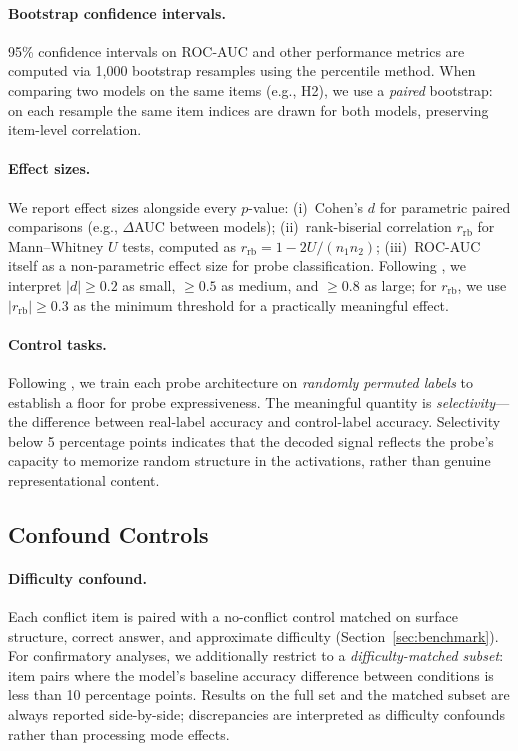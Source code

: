 \paragraph{Bootstrap confidence intervals.}
95\% confidence intervals on ROC-AUC and other performance metrics are
computed via 1{,}000 bootstrap resamples using the percentile method.  When
comparing two models on the same items (e.g., H2), we use a \emph{paired}
bootstrap: on each resample the same item indices are drawn for both models,
preserving item-level correlation.

\paragraph{Effect sizes.}
We report effect sizes alongside every $p$-value:
(i)~Cohen's $d$ for parametric paired comparisons (e.g., $\Delta$AUC
between models);
(ii)~rank-biserial correlation $r_{\text{rb}}$ for Mann--Whitney $U$ tests,
computed as $r_{\text{rb}} = 1 - 2U/(n_1 n_2)$;
(iii)~ROC-AUC itself as a non-parametric effect size for probe
classification.
Following \citet{cohen1988statistical}, we interpret $|d| \geq 0.2$ as
small, $\geq 0.5$ as medium, and $\geq 0.8$ as large; for
$r_{\text{rb}}$, we use $|r_{\text{rb}}| \geq 0.3$ as the minimum
threshold for a practically meaningful effect.

\paragraph{Control tasks.}
Following \citet{hewitt2019control}, we train each probe architecture on
\emph{randomly permuted labels} to establish a floor for probe
expressiveness.  The meaningful quantity is \emph{selectivity}---the
difference between real-label accuracy and control-label accuracy.
Selectivity below 5 percentage points indicates that the decoded signal
reflects the probe's capacity to memorize random structure in the
activations, rather than genuine representational content.

\subsection{Confound Controls}
\label{sec:confounds}

\paragraph{Difficulty confound.}
Each conflict item is paired with a no-conflict control matched on surface
structure, correct answer, and approximate difficulty
(Section~\ref{sec:benchmark}).  For confirmatory analyses, we additionally
restrict to a \emph{difficulty-matched subset}: item pairs where the
model's baseline accuracy difference between conditions is less than 10
percentage points.  Results on the full set and the matched subset are
always reported side-by-side; discrepancies are interpreted as difficulty
confounds rather than processing mode effects.

